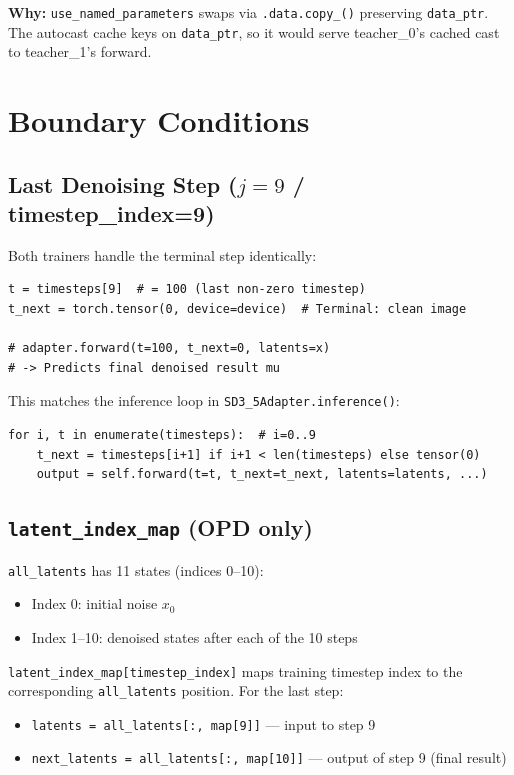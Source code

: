 \documentclass[11pt]{article}
\begin{document}
\textbf{Why:} \texttt{use\_named\_parameters} swaps via \texttt{.data.copy\_()} preserving \texttt{data\_ptr}. The autocast cache keys on \texttt{data\_ptr}, so it would serve teacher\_0's cached cast to teacher\_1's forward.

\section{Boundary Conditions}

\subsection{Last Denoising Step ($j=9$ / timestep\_index=9)}

Both trainers handle the terminal step identically:
\begin{lstlisting}
t = timesteps[9]  # = 100 (last non-zero timestep)
t_next = torch.tensor(0, device=device)  # Terminal: clean image

# adapter.forward(t=100, t_next=0, latents=x)
# -> Predicts final denoised result mu
\end{lstlisting}

This matches the inference loop in \texttt{SD3\_5Adapter.inference()}:
\begin{lstlisting}
for i, t in enumerate(timesteps):  # i=0..9
    t_next = timesteps[i+1] if i+1 < len(timesteps) else tensor(0)
    output = self.forward(t=t, t_next=t_next, latents=latents, ...)
\end{lstlisting}

\subsection{\texttt{latent\_index\_map} (OPD only)}

\texttt{all\_latents} has 11 states (indices 0--10):
\begin{itemize}[nosep]
    \item Index 0: initial noise $x_0$
    \item Index 1--10: denoised states after each of the 10 steps
\end{itemize}

\texttt{latent\_index\_map[timestep\_index]} maps training timestep index to the corresponding \texttt{all\_latents} position. For the last step:
\begin{itemize}[nosep]
    \item \texttt{latents = all\_latents[:, map[9]]} --- input to step 9
    \item \texttt{next\_latents = all\_latents[:, map[10]]} --- output of step 9 (final result)
\end{itemize}
\end{document}
